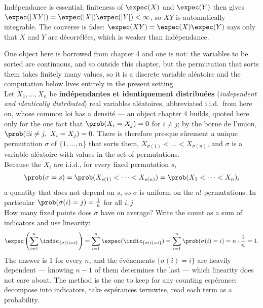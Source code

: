 Indépendance is essential; finiteness of $\expec(X)$ and $\expec(Y)$ then gives
$\expec(|XY|) = \expec(|X|)\expec(|Y|) < \infty$, so $XY$ is automatically
integrable. The converse is false: $\expec(XY) = \expec(X)\expec(Y)$ says only
that $X$ and $Y$ are décorrélées, which is weaker than indépendance.

\begin{example}
  One object here is borrowed from chapter 4 and one is not: the variables to be
  sorted are continuous, and so outside this chapter, but the permutation that
  sorts them takes finitely many values, so it is a discrete variable aléatoire
  and the computation below lives entirely in the present setting.\\

  Let $X_{1}, \dots, X_{n}$ be \textbf{indépendantes et identiquement
  distribuées} (\textit{independent and identically distributed}) real variables
  aléatoires, abbreviated i.i.d.\ from here on, whose common
  loi has a densité --- an object chapter 4 builds, quoted here only for
  the one fact that $\prob(X_{i} = X_{j}) = 0$ for $i \ne j$;
  by the borne de l'union, $\prob(\exists i \ne j,\ X_{i} = X_{j}) = 0$. There
  is therefore presque sûrement a unique permutation $\sigma$ of
  $\{1,\dots,n\}$ that sorts them,
  $X_{\sigma(1)} < \dots < X_{\sigma(n)}$, and $\sigma$ is a variable aléatoire
  with values in the set of permutations.\\

  Because the $X_{i}$ are i.i.d., for every fixed permutation $s$,
  \[ \prob(\sigma = s) = \prob(X_{s(1)} < \dots < X_{s(n)})
                       = \prob(X_{1} < \dots < X_{n}), \]
  a quantity that does not depend on $s$, so $\sigma$ is uniform on the $n!$
  permutations. In particular $\prob(\sigma(i) = j) = \tfrac1n$ for all $i,j$.\\

  How many fixed points does $\sigma$ have on average? Write the count as a sum
  of indicators and use linearity:
  \[ \expec\left( \sum_{i=1}^{n} \indic_{\{\sigma(i) = i\}} \right)
       = \sum_{i=1}^{n} \expec(\indic_{\{\sigma(i)=i\}})
       = \sum_{i=1}^{n} \prob(\sigma(i) = i)
       = n \cdot \frac{1}{n} = 1. \]
  The answer is $1$ for every $n$, and the événements $\{\sigma(i)=i\}$ are
  heavily dependent --- knowing $n-1$ of them determines the last --- which
  linearity does not care about. The method is the one to keep for any counting
  espérance: decompose into indicators, take espérances termwise, read each term
  as a probability.
\end{example}

